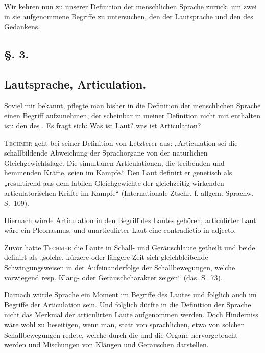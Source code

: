 Wir kehren nun zu unserer Definition der menschlichen Sprache zurück, um zwei in sie aufgenommene Begriffe zu untersuchen, den der Lautsprache und den des Gedankens.

\subsection*{§. 3.}\label{I.I.3}
\subsection*{Lautsprache, Articulation.}

Soviel mir bekannt, pflegte man bisher in die Definition der menschlichen Sprache einen Begriff aufzunehmen, der scheinbar in meiner Definition nicht mit enthalten ist: den des . Es fragt sich: Was ist Laut? was ist Articulation?

\textsc{Techmer} geht bei seiner Definition von Letzterer aus: „Articulation sei die schallbildende Abweichung der Sprachorgane von der natürlichen Gleichgewichtslage. Die simultanen Articulationen, die treibenden und hemmenden Kräfte, seien im Kampfe.“ Den Laut definirt er genetisch als „resultirend aus dem \label{sp.5} labilen Gleichgewichte der gleichzeitig wirkenden articulatorischen Kräfte im Kampfe“ (Internationale Ztschr. f. allgem. Sprachw.  S.~109).

Hiernach würde Articulation in den Begriff des Lautes gehören; articulirter Laut wäre ein Pleonasmus, und unarticulirter Laut eine contradictio in adjecto.

Zuvor hatte \textsc{Techmer} die Laute in Schall- und Geräuschlaute getheilt und beide definirt als „solche, kürzere oder längere Zeit sich gleichbleibende Schwingungsweisen in der Aufeinanderfolge der  Schallbewegungen, welche vorwiegend resp. Klang- oder Geräuschcharakter zeigen“ (das. S.~73).

Darnach würde Sprache ein Moment im Begriffe des Lautes und folglich auch im Begriffe der Articulation sein. Und folglich dürfte in die Definition der Sprache nicht das Merkmal der articulirten Laute aufgenommen werden. Doch  Hinderniss wäre wohl zu beseitigen, wenn man, statt von sprachlichen, etwa von solchen Schallbewegungen redete, \label{fp.6} welche durch die und die Organe hervorgebracht werden und Mischungen von Klängen und Geräuschen darstellen.


